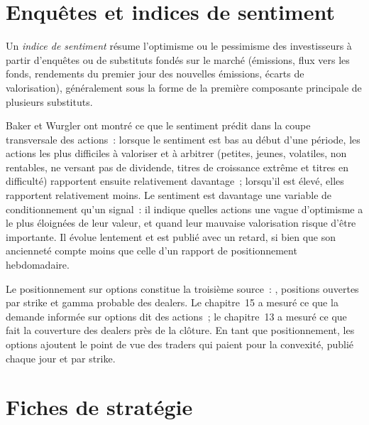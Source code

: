 \section{Enquêtes et indices de sentiment}

\begin{definition}\label{def:s1:positioning-and-sentiment:sentiment}
Un \emph{indice de sentiment} résume l'optimisme ou le pessimisme des investisseurs à partir d'enquêtes ou de substituts fondés sur le marché (émissions, flux vers les fonds,
rendements du premier jour des nouvelles émissions, écarts de valorisation), généralement sous la forme de la première composante principale de plusieurs substituts.
\end{definition}

Baker et Wurgler ont montré ce que le sentiment prédit dans la coupe transversale des actions~: lorsque le sentiment est bas au début d'une période, les actions les plus difficiles à valoriser
et à arbitrer (petites, jeunes, volatiles, non rentables, ne versant pas de dividende, titres de croissance extrême et titres en difficulté) rapportent ensuite relativement davantage~; lorsqu'il est élevé,
elles rapportent relativement moins. Le sentiment est davantage une variable de conditionnement qu'un signal~: il indique quelles actions une vague d'optimisme a le plus éloignées de leur valeur,
et quand leur mauvaise valorisation risque d'être importante. Il évolue lentement et est publié avec un retard, si bien que son ancienneté
compte moins que celle d'un rapport de positionnement hebdomadaire.

Le positionnement sur options constitue la troisième source~: , positions ouvertes par strike et gamma probable des dealers. Le chapitre~15 a mesuré ce que la demande informée sur options
dit des actions~; le chapitre~13 a mesuré ce que fait la couverture des dealers près de la clôture. En tant que positionnement, les options ajoutent le point de vue des traders qui paient
pour la convexité, publié chaque jour et par strike.

\section{Fiches de stratégie}

